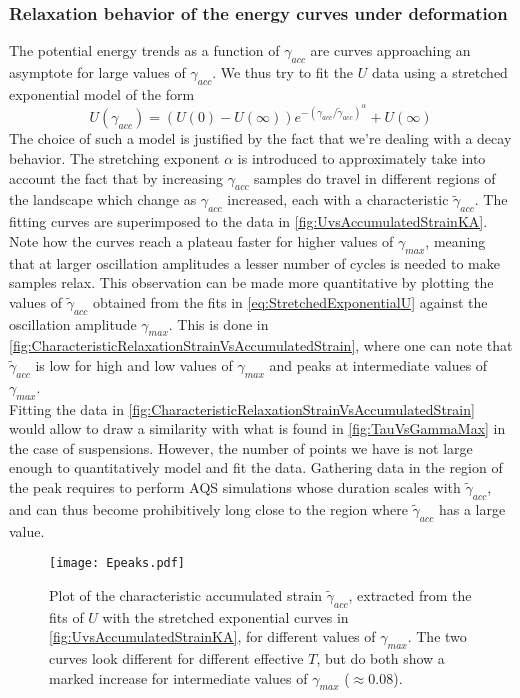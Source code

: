 \subsubsection{Relaxation behavior of the energy curves under deformation}

The potential energy trends as a function of $\gamma_{acc}$ are curves approaching an asymptote for large values of $\gamma_{acc}$. We thus try to fit the $U$ data using a stretched exponential model of the form
\begin{equation}
	U(\gamma_{acc}) = (U(0) - U(\infty)) e^{- (\gamma_{acc} / \widetilde{\gamma}_{acc})^{\alpha}} + U(\infty){}
	\label{eq:StretchedExponentialU}
\end{equation}
The choice of such a model is justified by the fact that we're dealing with a decay behavior. The stretching exponent $\alpha$ is introduced to approximately take into account the fact that by increasing $\gamma_{acc}$ samples do travel in different regions of the landscape which change as $\gamma_{acc}$ increased, each with a characteristic $\widetilde{\gamma}_{acc}$. The fitting curves are superimposed to the data in \autoref{fig:UvsAccumulatedStrainKA}. Note how the curves reach a plateau faster for higher values of $\gamma_{max}$, meaning that at larger oscillation amplitudes a lesser number of cycles is needed to make samples relax. This observation can be made more quantitative by plotting the values of $\widetilde{\gamma}_{acc}$ obtained from the fits in \autoref{eq:StretchedExponentialU} against the oscillation amplitude $\gamma_{max}$. This is done in \autoref{fig:CharacteristicRelaxationStrainVsAccumulatedStrain}, where one can note that $\widetilde{\gamma}_{acc}$ is low for high and low values of $\gamma_{max}$ and peaks at intermediate values of $\gamma_{max}$.\\
Fitting the data in \autoref{fig:CharacteristicRelaxationStrainVsAccumulatedStrain} would allow to draw a similarity with what is found in \autoref{fig:TauVsGammaMax} in the case of suspensions. However, the number of points we have is not large enough to quantitatively model and fit the data. Gathering data in the region of the peak requires to perform AQS simulations whose duration scales with $\widetilde{\gamma}_{acc}$, and can thus become prohibitively long close to the region where $\widetilde{\gamma}_{acc}$ has a large value.

\begin{figure}[!h] 
\centering 
\texttt{[image: Epeaks.pdf]} 
\caption{Plot of the characteristic accumulated strain $\widetilde{\gamma}_{acc}$, extracted from the fits of $U$ with the stretched exponential curves in \autoref{fig:UvsAccumulatedStrainKA}, for different values of $\gamma_{max}$. The two curves look different for different effective $T$, but do both show a marked increase for intermediate values of $\gamma_{max}$ ($\approx 0.08$). \label{fig:CharacteristicRelaxationStrainVsAccumulatedStrain}}
\end{figure}


